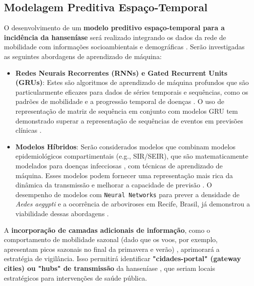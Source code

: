 \documentclass[preprint,12pt]{elsarticle}
\begin{document}
\subsection{Modelagem Preditiva Espaço-Temporal}
O desenvolvimento de um \textbf{modelo preditivo espaço-temporal para a incidência da hanseníase} será realizado integrando os dados da rede de mobilidade com informações socioambientais e demográficas \cite{inovacao2024modelagem}. Serão investigadas as seguintes abordagens de aprendizado de máquina:
\begin{itemize}[label=\textbullet]
    \item \textbf{Redes Neurais Recorrentes (RNNs) e Gated Recurrent Units (GRUs)}: Estes são algoritmos de aprendizado de máquina profundos que são particularmente eficazes para dados de séries temporais e sequências, como os padrões de mobilidade e a progressão temporal de doenças \cite{inovacao2024modelagem, shahidi2024exploring, shahidi2024conclusion, morid2023time, silva2022machine, madden2024deep, lecun2015deep, hochereiter1997long}. O uso de representação de matriz de sequência em conjunto com modelos GRU tem demonstrado superar a representação de sequências de eventos em previsões clínicas \cite{shahidi2024conclusion, shahidi2024contribution}.
    \item \textbf{Modelos Híbridos}: Serão considerados modelos que combinam modelos epidemiológicos compartimentais (e.g., SIR/SEIR), que são matematicamente modelados para doenças infecciosas \cite{inovacao2024modelagem, silva2022machine, madden2024deep, kermack1932contributions}, com técnicas de aprendizado de máquina. Esses modelos podem fornecer uma representação mais rica da dinâmica da transmissão e melhorar a capacidade de previsão \cite{inovacao2024modelagem, silva2022machine, madden2024deep}. O desempenho de modelos com \texttt{Neural Networks} para prever a densidade de \textit{Aedes aegypti} e a ocorrência de arboviroses em Recife, Brasil, já demonstrou a viabilidade dessas abordagens \cite{rubio2019zika}.
\end{itemize}
A \textbf{incorporação de camadas adicionais de informação}, como o comportamento de mobilidade sazonal (dado que os voos, por exemplo, apresentam picos sazonais no final da primavera e verão) \cite{inovacao2024modelagem, oliveira2024findings}, aprimorará a estratégia de vigilância. Isso permitirá identificar \textbf{"cidades-portal" (gateway cities) ou "hubs" de transmissão} da hanseníase \cite{inovacao2024modelagem}, que seriam locais estratégicos para intervenções de saúde pública.
\end{document}
